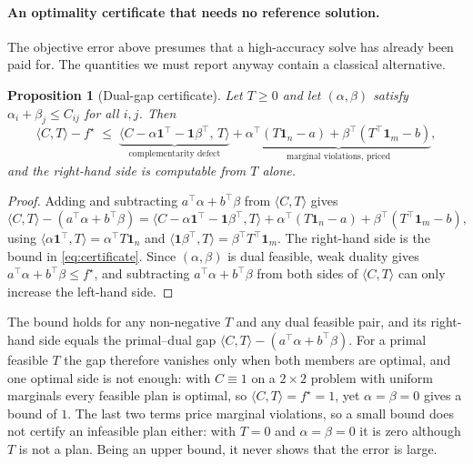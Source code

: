 \documentclass{article}
\newtheorem{proposition}{Proposition}
\begin{document}
\paragraph{An optimality certificate that needs no reference solution.}
The objective error above presumes that a high-accuracy solve has already been paid for.
The quantities we must report anyway contain a classical alternative.

\begin{proposition}[Dual-gap certificate]
\label{prop:certificate}
Let $T\ge0$ and let $(\alpha,\beta)$ satisfy $\alpha_i+\beta_j\le C_{ij}$ for all
$i,j$. Then
\begin{equation}
\label{eq:certificate}
\langle C,T\rangle-f^\star
\;\le\;
\underbrace{\bigl\langle C-\alpha\mathbf 1^\top-\mathbf 1\beta^\top,\,T\bigr\rangle}_{\text{complementarity defect}}
+\underbrace{\alpha^\top(T\mathbf 1_n-a)+\beta^\top(T^\top\mathbf 1_m-b)}_{\text{marginal violations, priced}},
\end{equation}
and the right-hand side is computable from $T$ alone.
\end{proposition}
\begin{proof}
Adding and subtracting $a^\top\alpha+b^\top\beta$ from $\langle C,T\rangle$ gives
\[\langle C,T\rangle-(a^\top\alpha+b^\top\beta)
=\langle C-\alpha\mathbf 1^\top-\mathbf 1\beta^\top,T\rangle
+\alpha^\top(T\mathbf 1_n-a)+\beta^\top(T^\top\mathbf 1_m-b),\]
using $\langle\alpha\mathbf 1^\top,T\rangle=\alpha^\top T\mathbf 1_n$ and
$\langle\mathbf 1\beta^\top,T\rangle=\beta^\top T^\top\mathbf 1_m$. The right-hand
side is the bound in \eqref{eq:certificate}. Since $(\alpha,\beta)$ is dual feasible,
weak duality gives $a^\top\alpha+b^\top\beta\le f^\star$, and subtracting
$a^\top\alpha+b^\top\beta$ from both sides of $\langle C,T\rangle$ can only increase
the left-hand side. \end{proof}

The bound holds for any non-negative $T$ and any dual feasible pair, and its right-hand
side equals the primal--dual gap $\langle C,T\rangle-(a^\top\alpha+b^\top\beta)$. For a
primal feasible $T$ the gap therefore vanishes only when both members are optimal, and one
optimal side is not enough: with $C\equiv1$ on a $2\times2$ problem with uniform marginals
every feasible plan is optimal, so $\langle C,T\rangle=f^\star=1$, yet $\alpha=\beta=0$
gives a bound of $1$. The last two terms price marginal violations, so a small bound does
not certify an infeasible plan either: with $T=0$ and $\alpha=\beta=0$ it is zero although
$T$ is not a plan. Being an upper bound, it never shows that the error is large.
\end{document}
